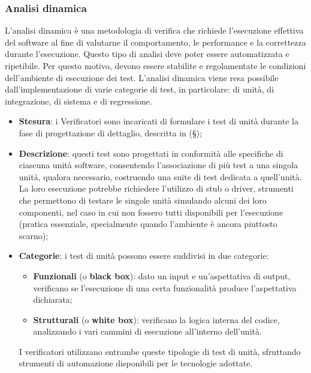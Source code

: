 \documentclass[10pt, a4paper]{article}
\begin{document}
\subsubsection{Analisi dinamica}
L'analisi dinamica è una metodologia di verifica che richiede l'esecuzione effettiva del software al fine di valutarne il comportamento, le performance e la correttezza durante l'esecuzione.
Questo tipo di analisi deve poter essere automatizzata e ripetibile. Per questo motivo, devono essere stabilite e regolamentate le condizioni dell'ambiente di esecuzione dei test. 
L'analisi dinamica viene resa possibile dall'implementazione di varie categorie di test, in particolare: di unità, di integrazione, di sistema e di regressione.

\begin{itemize}
    \item \textbf{Stesura}: i Verificatori sono incaricati di formulare i test di unità durante la fase di progettazione di dettaglio, descritta in (\S {});
    \item \textbf{Descrizione}: questi test sono progettati in conformità alle specifiche di ciascuna unità software, consentendo l'associazione di più test a una singola unità, qualora necessario, costruendo una suite di test dedicata a quell'unità.
    La loro esecuzione potrebbe richiedere l'utilizzo di stub o driver, strumenti che permettono di testare le singole unità simulando alcuni dei loro componenti, nel caso in cui non fossero tutti disponibili per l'esecuzione (pratica essenziale, specialmente quando l'ambiente è ancora piuttosto scarno);
    \item \textbf{Categorie}: i test di unità possono essere suddivisi in due categorie:
    \begin{itemize}
        \item \textbf{Funzionali} (o \textbf{black box}): dato un input e un'aspettativa di output, verificano se l'esecuzione di una certa funzionalità produce l'aspettativa dichiarata;
        \item \textbf{Strutturali} (o \textbf{white box}): verificano la logica interna del codice, analizzando i vari cammini di esecuzione all'interno dell'unità.
    \end{itemize}
    I verificatori utilizzano entrambe queste tipologie di test di unità, sfruttando strumenti di automazione disponibili per le tecnologie adottate. 
\end{itemize}
\end{document}
